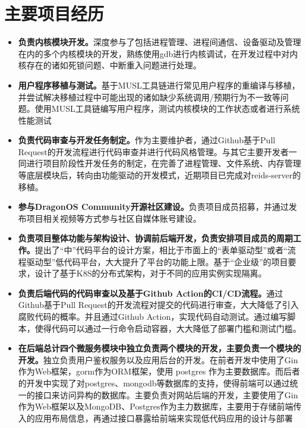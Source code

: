 \documentclass{resume}
\begin{document}
\section{主要项目经历}
\begin{itemize}
  \item \textbf{负责内核模块开发。}深度参与了包括进程管理、进程间通信、设备驱动及管理在内的多个内核模块的开发，熟练使用gdb进行内核调试，在开发过程中对内核存在的诸如死锁问题、中断重入问题进行处理。
  \item \textbf{用户程序移植与测试。}基于MUSL工具链进行常见用户程序的重编译与移植，并尝试解决移植过程中可能出现的诸如缺少系统调用/预期行为不一致等问题。使用MUSL工具链编写用户程序，测试内核模块的工作状态或者进行系统性能测试
  \item \textbf{负责代码审查与开发任务制定。}作为主要维护者，通过Github基于Pull Request的开发流程进行代码审查并进行代码风格管理。与其它主要开发者一同进行项目阶段性开发任务的制定，在完善了进程管理、文件系统、内存管理等底层模块后，转向由功能驱动的开发模式，近期项目已完成对reids-server的移植。
  \item \textbf{参与DragonOS Community开源社区建设。}负责项目成员招募，并通过发布项目相关视频等方式参与社区自媒体账号建设。
\end{itemize}
\begin{itemize}
  \item \textbf{负责项目整体功能与架构设计、协调前后端开发，负责安排项目成员的周期工作。}提出了“中”代码平台的设计方案，相比于市面上的“表单驱动型”或者“流程驱动型”低代码平台，大大提升了平台的功能上限。基于“企业级”的项目要求，设计了基于K8S的分布式架构，对于不同的应用实例实现隔离。
  \item \textbf{负责后端代码的代码审查以及基于Github Action的CI/CD流程。}通过Github基于Pull Request的开发流程对提交的代码进行审查，大大降低了引入腐败代码的概率。并且通过Github Action，实现代码自动测试。通过编写脚本，使得代码可以通过一行命令启动容器，大大降低了部署门槛和测试门槛。
  \item \textbf{在后端总计四个微服务模块中独立负责两个模块的开发，主要负责一个模块的开发。}独立负责用户鉴权服务以及应用后台的开发。在前者开发中使用了Gin作为Web框架，gorm作为ORM框架，使用 postgres 作为主要数据库。而后者的开发中实现了对postgres、mongodb等数据库的支持，使得前端可以通过统一的接口来访问异构的数据库。主要负责对网站后端的开发，主要使用了Gin作为Web框架以及MongoDB、Postgres作为主力数据库，主要用于存储前端传入的应用布局信息，再通过接口暴露给前端来实现低代码应用的设计与部署
\end{itemize}
\end{document}
